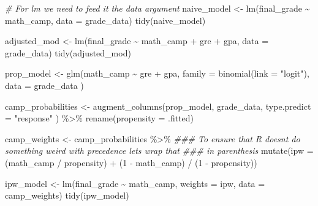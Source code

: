 \documentclass[]{tufte-handout}
\newenvironment{Shaded}{}{}
\newcommand{\AttributeTok}[1]{\textcolor[rgb]{0.49,0.56,0.16}{#1}}
\newcommand{\CommentTok}[1]{\textcolor[rgb]{0.38,0.63,0.69}{\textit{#1}}}
\newcommand{\DecValTok}[1]{\textcolor[rgb]{0.25,0.63,0.44}{#1}}
\newcommand{\DocumentationTok}[1]{\textcolor[rgb]{0.73,0.13,0.13}{\textit{#1}}}
\newcommand{\FunctionTok}[1]{\textcolor[rgb]{0.02,0.16,0.49}{#1}}
\newcommand{\NormalTok}[1]{#1}
\newcommand{\OtherTok}[1]{\textcolor[rgb]{0.00,0.44,0.13}{#1}}
\newcommand{\SpecialCharTok}[1]{\textcolor[rgb]{0.25,0.44,0.63}{#1}}
\newcommand{\StringTok}[1]{\textcolor[rgb]{0.25,0.44,0.63}{#1}}
\begin{document}
\begin{Shaded}
\begin{Highlighting}[]
\CommentTok{\# For lm we need to feed it the data argument}
\NormalTok{naive\_model }\OtherTok{\textless{}{-}} \FunctionTok{lm}\NormalTok{(final\_grade }\SpecialCharTok{\textasciitilde{}}\NormalTok{ math\_camp, }\AttributeTok{data =}\NormalTok{ grade\_data)}
\FunctionTok{tidy}\NormalTok{(naive\_model)}


\NormalTok{adjusted\_mod }\OtherTok{\textless{}{-}} \FunctionTok{lm}\NormalTok{(final\_grade }\SpecialCharTok{\textasciitilde{}}\NormalTok{ math\_camp }\SpecialCharTok{+}\NormalTok{ gre }\SpecialCharTok{+}\NormalTok{ gpa, }\AttributeTok{data =}\NormalTok{ grade\_data)}
\FunctionTok{tidy}\NormalTok{(adjusted\_mod)}



\NormalTok{prop\_model }\OtherTok{\textless{}{-}} \FunctionTok{glm}\NormalTok{(math\_camp }\SpecialCharTok{\textasciitilde{}}\NormalTok{ gre }\SpecialCharTok{+}\NormalTok{ gpa,}
  \AttributeTok{family =} \FunctionTok{binomial}\NormalTok{(}\AttributeTok{link =} \StringTok{"logit"}\NormalTok{),}
  \AttributeTok{data =}\NormalTok{ grade\_data}
\NormalTok{)}

\NormalTok{camp\_probabilities }\OtherTok{\textless{}{-}} \FunctionTok{augment\_columns}\NormalTok{(prop\_model,}
\NormalTok{  grade\_data,}
  \AttributeTok{type.predict =} \StringTok{"response"}
\NormalTok{) }\SpecialCharTok{\%\textgreater{}\%}
  \FunctionTok{rename}\NormalTok{(}\AttributeTok{propensity =}\NormalTok{ .fitted)}


\NormalTok{camp\_weights }\OtherTok{\textless{}{-}}\NormalTok{ camp\_probabilities }\SpecialCharTok{\%\textgreater{}\%}
  \DocumentationTok{\#\#\# To ensure that R doesn\textquotesingle{}t do something weird with precedence lets wrap that}
  \DocumentationTok{\#\#\# in parenthesis}
  \FunctionTok{mutate}\NormalTok{(}\AttributeTok{ipw =}\NormalTok{ (math\_camp }\SpecialCharTok{/}\NormalTok{ propensity) }\SpecialCharTok{+}\NormalTok{ (}\DecValTok{1} \SpecialCharTok{{-}}\NormalTok{ math\_camp) }\SpecialCharTok{/}\NormalTok{ (}\DecValTok{1} \SpecialCharTok{{-}}\NormalTok{ propensity))}

\NormalTok{ipw\_model }\OtherTok{\textless{}{-}} \FunctionTok{lm}\NormalTok{(final\_grade }\SpecialCharTok{\textasciitilde{}}\NormalTok{ math\_camp, }\AttributeTok{weights =}\NormalTok{ ipw, }\AttributeTok{data =}\NormalTok{ camp\_weights)}
\FunctionTok{tidy}\NormalTok{(ipw\_model)}
\end{Highlighting}
\end{Shaded}
\end{document}
